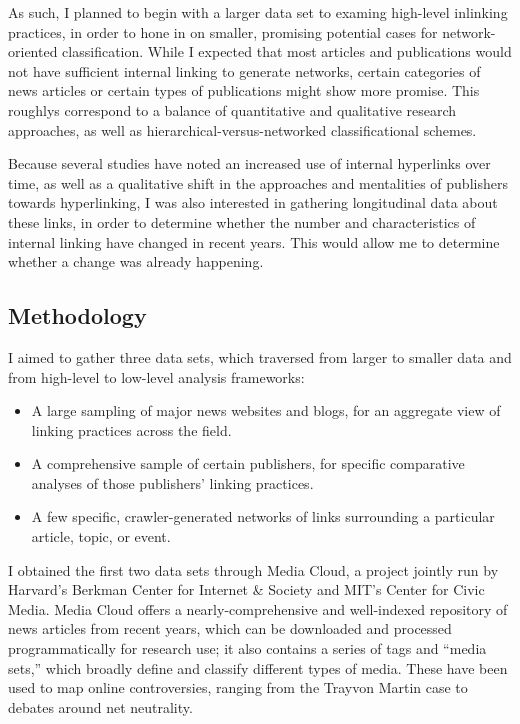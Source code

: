 As such, I planned to begin with a larger data set to examing high-level inlinking practices, in order to hone in on smaller, promising potential cases for network-oriented classification. While I expected that most articles and publications would not have sufficient internal linking to generate networks, certain categories of news articles or certain types of publications might show more promise. This roughlys correspond to a balance of quantitative and qualitative research approaches, as well as hierarchical-versus-networked classificational schemes.

Because several studies have noted an increased use of internal hyperlinks over time, as well as a qualitative shift in the approaches and mentalities of publishers towards hyperlinking, I was also interested in gathering longitudinal data about these links, in order to determine whether the number and characteristics of internal linking have changed in recent years. This would allow me to determine whether a change was already happening.

\subsection{Methodology}

I aimed to gather three data sets, which traversed from larger to smaller data and from high-level to low-level analysis frameworks:\begin{itemize}
\item A large sampling of major news websites and blogs, for an aggregate view of linking practices across the field.
\item A comprehensive sample of certain publishers, for specific comparative analyses of those publishers' linking practices.
\item A few specific, crawler-generated networks of links surrounding a particular article, topic, or event.\end{itemize}

\noindent I obtained the first two data sets through Media Cloud, a project jointly run by Harvard's Berkman Center for Internet \& Society and MIT's Center for Civic Media. Media Cloud offers a nearly-comprehensive and well-indexed repository of news articles from recent years, which can be downloaded and processed programmatically for research use; it also contains a series of tags and ``media sets,'' which broadly define and classify different types of media. These have been used to map online controversies, ranging from the Trayvon Martin case to debates around net neutrality.\autocites[See][]{benkler_social_2013}{graeff_battle_2014}

